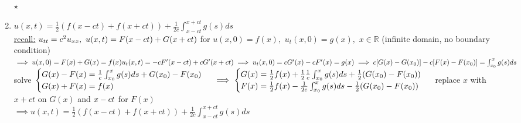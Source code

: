 \documentclass[12pt]{amsart}
\begin{document}
\begin{enumerate}
$\star$
\item \underline{$u(x,t) = \frac{1}{2}(f(x-ct) + f(x+ct) ) + \frac{1}{2c} \int_{x-ct}^{x+ct} g(s)ds$}\\
\underline{recall:} $u_{tt} = c^2 u_{xx},\,\, u(x,t) = F(x-ct) + G(x+ct)\\$
for $u(x,0) = f(x),\,\, u_t(x,0) = g(x),\,\, x \in \mathbb{R}$ (infinite domain, no boundary condition)\\
$\implies u(x,0) = F(x) + G(x) = f(x)\\
u_t (x,t) = - c F'(x-ct) + c G'(x+ct)\\
\implies u_t(x,0) = c G'(x) - c F'(x) = g(x)\\
\implies c[G(x) - G(x_0)] - c [ F(x) - F(x_0)] = \int_{x_0}^x g(s) ds\\$
solve 
$
\begin{cases}
	G(x) -  F(x) = \frac{1}{c} \int_{x_0}^x g(s) ds + G(x_0) - F(x_0)\\
 	G(x) + F(x) = f(x)
\end{cases} \\
\implies 
\begin{cases}
	G(x) = \frac{1}{2}f(x) + \frac{1}{2} \frac{1}{c} \int_{x_0}^x g(s) ds + \frac{1}{2}(G(x_0) - F(x_0)) \\
	F(x) = \frac{1}{2} f(x) - \frac{1}{2c} \int_{x_0}^x g(s) ds - \frac{1}{2}(G(x_0) - F(x_0))
\end{cases}\\$
replace $x$ with $x+ct$ on $G(x)$ and $x-ct\\$
for $F(x)$ \\
$\implies u(x,t) = \frac{1}{2}(f(x-ct) + f(x+ct)) + \frac{1}{2c} \int_{x-ct}^{x+ct} g(s) ds$



\hdashrule[0.5ex][c]{\linewidth}{0.5pt}{1.5mm}\\



\end{enumerate}
\end{document}
